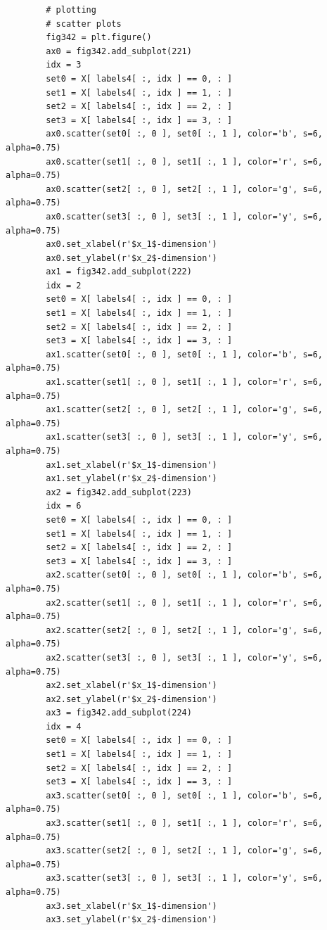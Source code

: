 \begin{verbatim}
        # plotting
        # scatter plots
        fig342 = plt.figure()
        ax0 = fig342.add_subplot(221)
        idx = 3
        set0 = X[ labels4[ :, idx ] == 0, : ]
        set1 = X[ labels4[ :, idx ] == 1, : ]
        set2 = X[ labels4[ :, idx ] == 2, : ]
        set3 = X[ labels4[ :, idx ] == 3, : ]
        ax0.scatter(set0[ :, 0 ], set0[ :, 1 ], color='b', s=6, alpha=0.75)
        ax0.scatter(set1[ :, 0 ], set1[ :, 1 ], color='r', s=6, alpha=0.75)
        ax0.scatter(set2[ :, 0 ], set2[ :, 1 ], color='g', s=6, alpha=0.75)
        ax0.scatter(set3[ :, 0 ], set3[ :, 1 ], color='y', s=6, alpha=0.75)
        ax0.set_xlabel(r'$x_1$-dimension')
        ax0.set_ylabel(r'$x_2$-dimension')
        ax1 = fig342.add_subplot(222)
        idx = 2
        set0 = X[ labels4[ :, idx ] == 0, : ]
        set1 = X[ labels4[ :, idx ] == 1, : ]
        set2 = X[ labels4[ :, idx ] == 2, : ]
        set3 = X[ labels4[ :, idx ] == 3, : ]
        ax1.scatter(set0[ :, 0 ], set0[ :, 1 ], color='b', s=6, alpha=0.75)
        ax1.scatter(set1[ :, 0 ], set1[ :, 1 ], color='r', s=6, alpha=0.75)
        ax1.scatter(set2[ :, 0 ], set2[ :, 1 ], color='g', s=6, alpha=0.75)
        ax1.scatter(set3[ :, 0 ], set3[ :, 1 ], color='y', s=6, alpha=0.75)
        ax1.set_xlabel(r'$x_1$-dimension')
        ax1.set_ylabel(r'$x_2$-dimension')
        ax2 = fig342.add_subplot(223)
        idx = 6
        set0 = X[ labels4[ :, idx ] == 0, : ]
        set1 = X[ labels4[ :, idx ] == 1, : ]
        set2 = X[ labels4[ :, idx ] == 2, : ]
        set3 = X[ labels4[ :, idx ] == 3, : ]
        ax2.scatter(set0[ :, 0 ], set0[ :, 1 ], color='b', s=6, alpha=0.75)
        ax2.scatter(set1[ :, 0 ], set1[ :, 1 ], color='r', s=6, alpha=0.75)
        ax2.scatter(set2[ :, 0 ], set2[ :, 1 ], color='g', s=6, alpha=0.75)
        ax2.scatter(set3[ :, 0 ], set3[ :, 1 ], color='y', s=6, alpha=0.75)
        ax2.set_xlabel(r'$x_1$-dimension')
        ax2.set_ylabel(r'$x_2$-dimension')
        ax3 = fig342.add_subplot(224)
        idx = 4
        set0 = X[ labels4[ :, idx ] == 0, : ]
        set1 = X[ labels4[ :, idx ] == 1, : ]
        set2 = X[ labels4[ :, idx ] == 2, : ]
        set3 = X[ labels4[ :, idx ] == 3, : ]
        ax3.scatter(set0[ :, 0 ], set0[ :, 1 ], color='b', s=6, alpha=0.75)
        ax3.scatter(set1[ :, 0 ], set1[ :, 1 ], color='r', s=6, alpha=0.75)
        ax3.scatter(set2[ :, 0 ], set2[ :, 1 ], color='g', s=6, alpha=0.75)
        ax3.scatter(set3[ :, 0 ], set3[ :, 1 ], color='y', s=6, alpha=0.75)
        ax3.set_xlabel(r'$x_1$-dimension')
        ax3.set_ylabel(r'$x_2$-dimension')


\end{verbatim}
